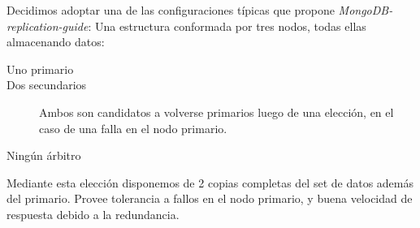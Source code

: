 Decidimos adoptar una de las configuraciones típicas que propone \emph{MongoDB-replication-guide}: 
Una estructura conformada por tres nodos, todas ellas almacenando datos: 

\begin{description}
	\item[Uno primario] 
	\item[Dos secundarios] Ambos son candidatos a volverse primarios luego de una elección, en el caso de una falla
	en el nodo primario.
	\item[Ningún árbitro]
\end{description}

Mediante esta elección disponemos de 2 copias completas del set de datos además del primario. Provee tolerancia a fallos
en el nodo primario, y buena velocidad de respuesta debido a la redundancia.








